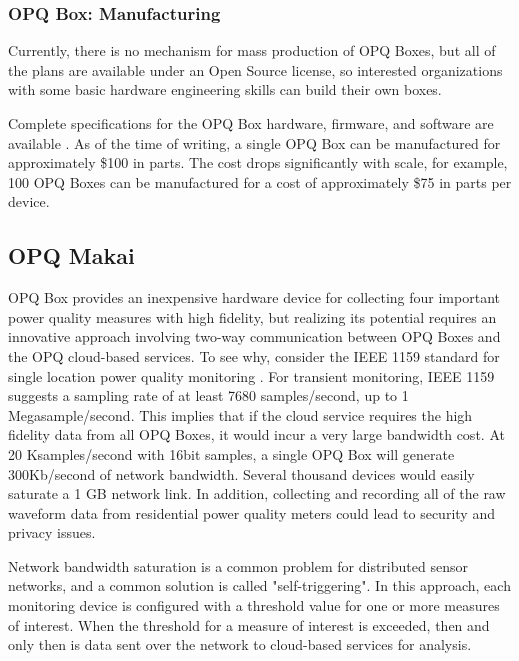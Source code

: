 \subsubsection{OPQ Box: Manufacturing}

Currently, there is no mechanism for mass production of OPQ Boxes, but all of the plans are available under an Open Source license, so interested organizations with some basic hardware engineering skills can build their own boxes.

Complete specifications for the OPQ Box hardware, firmware, and software are available \cite{negrashov_opq_2020}. As of the time of writing, a single OPQ Box can be manufactured for approximately \$100 in parts. The cost drops significantly with scale, for example, 100 OPQ Boxes can be manufactured for a cost of approximately \$75 in parts per device.



\subsection{OPQ Makai}
\label{sec:opq-makai}

OPQ Box provides an inexpensive hardware device for collecting four important power quality measures with high fidelity, but realizing its potential requires an innovative approach involving two-way communication between OPQ Boxes and the OPQ cloud-based services. To see why, consider the IEEE 1159 standard for single location power quality monitoring \cite{unruh_ieee_2018}.  For transient monitoring, IEEE 1159 suggests a sampling rate of at least 7680 samples/second, up to 1 Megasample/second. This implies that if the cloud service requires the high fidelity data from all OPQ Boxes, it would incur a very large bandwidth cost. At 20 Ksamples/second with 16bit samples, a single OPQ Box will generate 300Kb/second of network bandwidth. Several thousand devices would easily saturate a 1 GB network link. In addition, collecting and recording all of the raw waveform data from residential power quality meters could lead to security and privacy issues.

Network bandwidth saturation is a common problem for distributed sensor networks, and a common solution is called "self-triggering".  In this approach, each monitoring device is configured with a threshold value for one or more measures of interest. When the threshold for a measure of interest is exceeded, then and only then is data sent over the network to cloud-based services for analysis.

